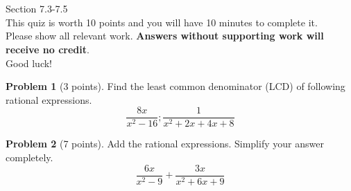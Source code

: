 \documentclass[11pt]{article}
\theoremstyle{definition}
\newtheorem{problem}{Problem}
\begin{document}
\section*{}
Section 7.3-7.5\\
This quiz is worth 10 points and you will have 10 minutes to complete it.\\
Please show all relevant work. \textbf{Answers without supporting work will receive no credit}.\\
Good luck!
\begin{problem}[3 points] Find the least common denominator (LCD) of following rational expressions.
\[\frac{8x}{x^2-16};\frac{1}{x^2+2x+4x+8}  \]


\end{problem}


\vspace{2in}

\begin{problem}[7 points] Add the rational expressions. Simplify your answer completely.
\[
\frac{6x}{x^{2}-9}+\frac{3x}{x^{2}+6x+9}  
\]
\end{problem}
\end{document}
